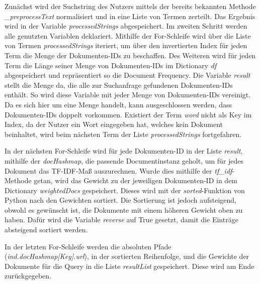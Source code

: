 Zunächst wird der Suchstring des Nutzers mittels der bereits bekannten Methode \textit{\_preprocessText} normalisiert und in eine Liste von Termen zerteilt. Das Ergebnis wird in der Variable \textit{processedStrings} abgespeichert. Im zweiten Schritt werden alle genutzten Variablen deklariert. Mithilfe der For-Schleife wird über die Liste von Termen \textit{processedStrings} iteriert, um über den invertierten Index für jeden Term die Menge der Dokumenten-IDs zu beschaffen. Des Weiteren wird für jeden Term die Länge seiner Menge von Dokumenten-IDs im Dictionary \textit{df} abgespeichert und repräsentiert so die Document Frequency. Die Variable \textit{result} stellt die Menge da, die alle zur Suchanfrage gefundenen Dokumenten-IDs enthält. So wird diese Variable mit jeder Menge von Dokumenten-IDs vereinigt. Da es sich hier um eine Menge handelt, kann ausgeschlossen werden, dass Dokumenten-IDs doppelt vorkommen. Existiert der Term \textit{word} nicht als Key im Index, da der Nutzer ein Wort eingegeben hat, welches kein Dokument beinhaltet, wird beim nächsten Term der Liste \emph{processedStrings} fortgefahren.

In der nächsten For-Schleife wird für jede Dokumenten-ID in der Liste \textit{result}, mithilfe der \textit{docHashmap}, die passende Documentinstanz geholt, um für jedes Dokument das TF-IDF-Maß auszurechnen. Wurde dies mithilfe der \textit{tf\_idf}-Methode getan, wird das Gewicht zu der jeweiligen Dokumenten-ID in dem Dictionary \textit{weightedDocs} gespeichert. Dieses wird mit der \textit{sorted}-Funktion von Python nach den Gewichten sortiert. Die Sortierung ist jedoch aufsteigend, obwohl es gewünscht  ist, die Dokumente mit einem höheren Gewicht oben zu haben. Dafür wird die Variable \textit{reverse} auf True gesetzt, damit die Einträge absteigend sortiert werden.

In der letzten For-Schleife werden die absoluten Pfade (\textit{ind.docHashmap[Key].url}), in der sortierten Reihenfolge, und die Gewichte der Dokumente für die Query in die Liste \textit{resultList} gespeichert. Diese wird am Ende zurückgegeben.

